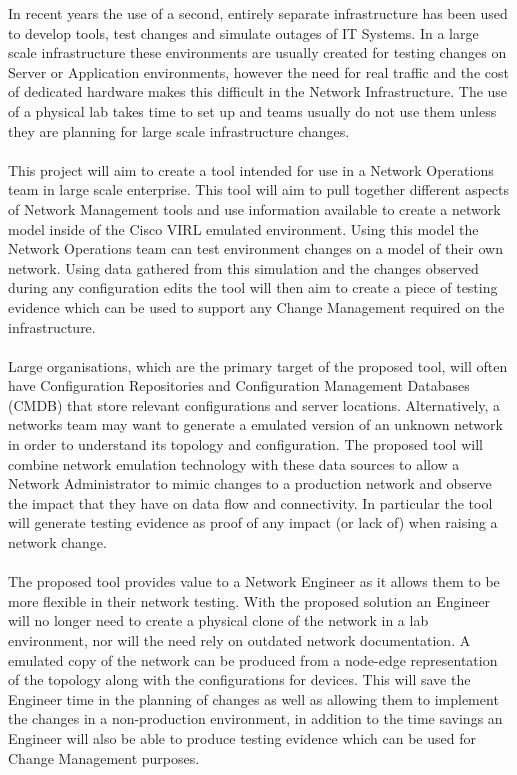 \documentclass[11pt]{report}
\begin{document}
In recent years the use of a second, entirely separate infrastructure has been used to develop tools, test changes and simulate outages of IT Systems. In a large scale infrastructure these environments are usually created for testing changes on Server or Application environments, however the need for real traffic and the cost of dedicated hardware makes this difficult in the Network Infrastructure. The use of a physical lab takes time to set up and teams usually do not use them unless they are planning for large scale infrastructure changes.
\\
\\
This project will aim to create a tool intended for use in a Network Operations team in large scale enterprise. This tool will aim to pull together different aspects of Network Management tools and use information available to create a network model inside of the Cisco VIRL emulated environment. Using this model the Network Operations team can test environment changes on a model of their own network. Using data gathered from this simulation and the changes observed during any configuration edits the tool will then aim to create a piece of testing evidence which can be used to support any Change Management required on the infrastructure.
\\
\\
Large organisations, which are the primary target of the proposed tool, will often have Configuration Repositories and Configuration Management Databases (CMDB) that store relevant configurations and server locations. Alternatively, a networks team may want to generate a emulated version of an unknown network in order to understand its topology and configuration. The proposed tool will combine network emulation technology with these data sources to allow a Network Administrator to mimic changes to a production network and observe the impact that they have on data flow and connectivity. In particular the tool will generate testing evidence as proof of any impact (or lack of) when raising a network change.
\\
\\
The proposed tool provides value to a Network Engineer as it allows them to be more flexible in their network testing. With the proposed solution an Engineer will no longer need to create a physical clone of the network in a lab environment, nor will the need rely on outdated network documentation. A emulated copy of the network can be produced from a node-edge representation of the topology along with the configurations for devices. This will save the Engineer time in the planning of changes as well as allowing them to implement the changes in a non-production environment, in addition to the time savings an Engineer will also be able to produce testing evidence which can be used for Change Management purposes.
\end{document}
